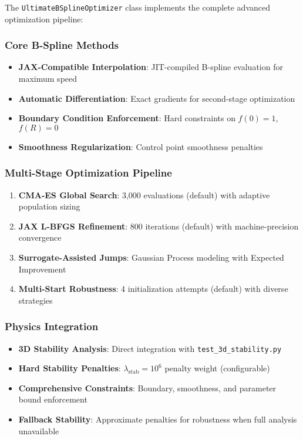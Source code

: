 \documentclass[12pt,a4paper]{article}
\begin{document}
The \texttt{UltimateBSplineOptimizer} class implements the complete advanced optimization pipeline:

\subsubsection{Core B-Spline Methods}
\begin{itemize}
\item \textbf{JAX-Compatible Interpolation}: JIT-compiled B-spline evaluation for maximum speed
\item \textbf{Automatic Differentiation}: Exact gradients for second-stage optimization
\item \textbf{Boundary Condition Enforcement}: Hard constraints on $f(0) = 1$, $f(R) = 0$
\item \textbf{Smoothness Regularization}: Control point smoothness penalties
\end{itemize}

\subsubsection{Multi-Stage Optimization Pipeline}
\begin{enumerate}
\item \textbf{CMA-ES Global Search}: 3,000 evaluations (default) with adaptive population sizing
\item \textbf{JAX L-BFGS Refinement}: 800 iterations (default) with machine-precision convergence
\item \textbf{Surrogate-Assisted Jumps}: Gaussian Process modeling with Expected Improvement
\item \textbf{Multi-Start Robustness}: 4 initialization attempts (default) with diverse strategies
\end{enumerate}

\subsubsection{Physics Integration}
\begin{itemize}
\item \textbf{3D Stability Analysis}: Direct integration with \texttt{test\_3d\_stability.py}
\item \textbf{Hard Stability Penalties}: $\lambda_{\text{stab}} = 10^6$ penalty weight (configurable)
\item \textbf{Comprehensive Constraints}: Boundary, smoothness, and parameter bound enforcement
\item \textbf{Fallback Stability}: Approximate penalties for robustness when full analysis unavailable
\end{itemize}
\end{document}
